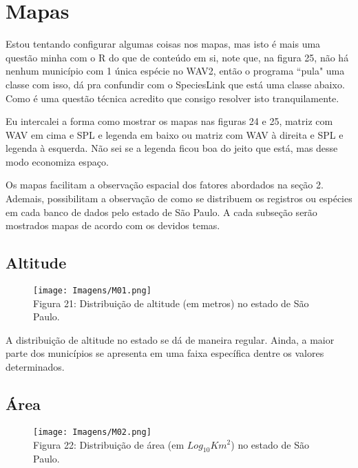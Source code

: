 \documentclass[12pt]{extarticle}
\newcommand{\asp}[1]{``#1"}
\newenvironment{resposta}{ \color{mygray}}{}
\begin{document}
\section{Mapas}

\hrulefill

Estou tentando configurar algumas coisas nos mapas, mas isto é mais uma questão minha com o R do que de conteúdo em si, note que, na figura 25, não há nenhum município com 1 única espécie no WAV2, então o programa \asp{pula} uma classe com isso, dá pra confundir com o SpeciesLink que está uma classe abaixo. Como é uma questão técnica acredito que consigo resolver isto tranquilamente.

Eu intercalei a forma como mostrar os mapas nas figuras 24 e 25, matriz com WAV em cima e SPL e legenda em baixo ou matriz com WAV à direita e SPL e legenda à esquerda. Não sei se a legenda ficou boa do jeito que está, mas desse modo economiza espaço.

\hrulefill

\begin{resposta}
Os mapas facilitam a observação espacial dos fatores abordados na seção 2. Ademais, possibilitam a observação de como se distribuem os registros ou espécies em cada banco de dados pelo estado de São Paulo. A cada subseção serão mostrados mapas de acordo com os devidos temas.
\end{resposta}

\subsection{Altitude}

\begin{figure}[h!]
\centering
\texttt{[image: Imagens/M01.png]}
\\{\scriptsize Figura 21: Distribuição de altitude (em metros) no estado de São Paulo.}
\end{figure}

\begin{resposta}
A distribuição de altitude no estado se dá de maneira regular. Ainda, a maior parte dos municípios se apresenta em uma faixa específica dentre os valores determinados.
\end{resposta}

\subsection {Área}

\begin{figure}[h!]
\centering
\texttt{[image: Imagens/M02.png]}
\\{\scriptsize Figura 22: Distribuição de área (em $Log_{10}Km^2$) no estado de São Paulo.}
\end{figure}
\end{document}
